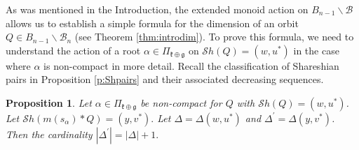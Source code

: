 \documentclass[12pt]{amsart}
\numberwithin{equation}{section}
\newtheorem{prop}[thm]{Proposition}
\newcommand{\fk}{\mbox{${\mathfrak k}$}}
\newcommand{\fg}{\mbox{${\mathfrak g}$}}
\newcommand{\B}{\mathcal{B}}
\newcommand{\ms}{m(s_{\alpha})}
\newcommand{\Borbitspace}{B_{n-1}\backslash\B_{n}}
\newcommand{\Sh}{\mathcal{S}h}
\begin{document}









 
As was mentioned in the Introduction, the extended monoid action on $B_{n-1}\backslash\B$ allows us to establish a simple formula for the dimension of an orbit $Q\in\Borbitspace$ (see Theorem \ref{thm:introdim}).  To prove this formula, we need to understand the action of a root $\alpha\in \Pi_{\fk \oplus \fg}$ on $\Sh(Q)=(w,u^{*})$ in the case where $\alpha$ is non-compact   in more detail.  Recall the classification of Shareshian pairs in Proposition \ref{p:Shpairs} and their associated decreasing sequences.  
\begin{prop}\label{p:shnc}
Let $\alpha\in\Pi_{\fk \oplus \fg}$ be non-compact for $Q$ with $\Sh(Q)=(w,u^{*})$.  Let $\Sh(\ms*Q)=(y,v^{*}).$  
Let $\Delta = \Delta(w,u^*)$ and $\Delta^{\prime}=\Delta(y,v^*)$.  Then the cardinality $|\Delta^{\prime}|=|\Delta|+1.$
\end{prop}
\end{document}
